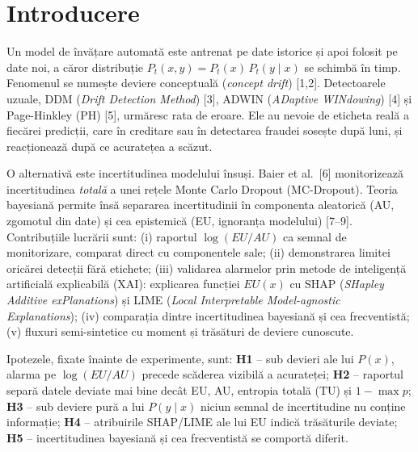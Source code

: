 \documentclass[12pt,a4paper]{article}
\begin{document}

\hypertarget{introducere}{%
\section{Introducere}\label{introducere}}

Un model de învățare automată este antrenat pe date istorice și apoi
folosit pe date noi, a căror distribuție
\(P_t(x,y)=P_t(x)\,P_t(y\mid x)\) se schimbă în timp. Fenomenul se
numește deviere conceptuală (\emph{concept drift}) {[}1,2{]}.
Detectoarele uzuale, DDM (\emph{Drift Detection Method}) {[}3{]}, ADWIN
(\emph{ADaptive WINdowing}) {[}4{]} și Page-Hinkley (PH) {[}5{]},
urmăresc rata de eroare. Ele au nevoie de eticheta reală a fiecărei
predicții, care în creditare sau în detectarea fraudei sosește după
luni, și reacționează după ce acuratețea a scăzut.

O alternativă este incertitudinea modelului însuși. Baier et al.~{[}6{]}
monitorizează incertitudinea \emph{totală} a unei rețele Monte Carlo
Dropout (MC-Dropout). Teoria bayesiană permite însă separarea
incertitudinii în componenta aleatorică (AU, zgomotul din date) și cea
epistemică (EU, ignoranța modelului) {[}7--9{]}. Contribuțiile lucrării
sunt: (i) raportul \(\log(EU/AU)\) ca semnal de monitorizare, comparat
direct cu componentele sale; (ii) demonstrarea limitei oricărei detecții
fără etichete; (iii) validarea alarmelor prin metode de inteligență
artificială explicabilă (XAI): explicarea funcției \(EU(x)\) cu SHAP
(\emph{SHapley Additive exPlanations}) și LIME (\emph{Local
Interpretable Model-agnostic Explanations}); (iv) comparația dintre
incertitudinea bayesiană și cea frecventistă; (v) fluxuri semi-sintetice
cu moment și trăsături de deviere cunoscute.

Ipotezele, fixate înainte de experimente, sunt: \textbf{H1} -- sub
devieri ale lui \(P(x)\), alarma pe \(\log(EU/AU)\) precede scăderea
vizibilă a acurateței; \textbf{H2} -- raportul separă datele deviate mai
bine decât EU, AU, entropia totală (TU) și \(1-\max p\); \textbf{H3} --
sub deviere pură a lui \(P(y\mid x)\) niciun semnal de incertitudine nu
conține informație; \textbf{H4} -- atribuirile SHAP/LIME ale lui EU
indică trăsăturile deviate; \textbf{H5} -- incertitudinea bayesiană și
cea frecventistă se comportă diferit.
\end{document}

